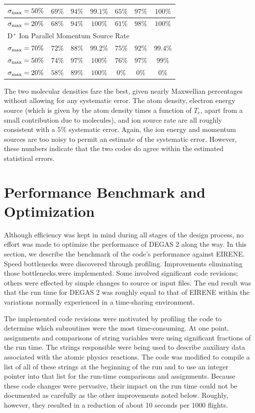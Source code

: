 \documentclass[12pt]{report}
\begin{document}
\begin{tabular}{|c||c|c|c||c|c|c|}
$\sigma_{\rm max}=50 \%$ & $69 \%$ & $94 \%$ & $99.1 \%$ & $65 \%$ & $97 \%$ & $100  \%$ \\ \hline
$\sigma_{\rm max}=20 \%$ & $68 \%$ & $94 \%$ & $100  \%$ & $61 \%$ & $98 \%$ & $100  \%$ \\ \hline
\multicolumn{7}{|l|}{D$^{+}$ Ion Parallel Momentum Source Rate} \\ \hline
$\sigma_{\rm max}=70 \%$ & $72 \%$ & $88 \%$ & $99.2 \%$ & $75 \%$ & $92  \%$ & $99.4 \%$ \\ \hline
$\sigma_{\rm max}=50 \%$ & $74 \%$ & $97 \%$ & $100 \%$ & $76 \%$ & $97  \%$ & $99   \%$ \\ \hline
$\sigma_{\rm max}=20 \%$ & $58 \%$ & $89 \%$ & $100 \%$ & $0  \%$ & $0   \%$ & $0    \%$ \\ \hline
\end{tabular}

The two molecular densities fare the best, given nearly Maxwellian percentages
without allowing for any systematic error. The atom density,  electron
energy source (which is given by the atom density times a function of $T_{e}$,
apart from a small contribution due to molecules), and ion
source rate are all roughly consistent
with a $5 \%$ systematic error. Again, the ion energy and momentum sources
are too noisy to permit an estimate of the systematic error. However, these
numbers indicate that the two codes do agree within the estimated
statistical errors.

\section{Performance Benchmark and Optimization}
\label{performance}

Although efficiency was kept in mind during all
stages of the design process, no effort was made to optimize the
performance of DEGAS 2 along the way.
In this section, we describe the benchmark of the code's performance against 
EIRENE. Speed bottlenecks were discovered through profiling. 
Improvements eliminating those bottlenecks.were implemented.
Some involved
significant code revisions; others were
effected by simple changes to source or
input files. The end result was that the run time for DEGAS 2 was 
roughly equal to
that of EIRENE within the variations normally experienced in a time-sharing
environment.

The implemented code revisions were motivated by profiling the code to
determine which subroutines were the most time-consuming. At one point,
assignments and comparisons of string variables were using significant
fractions of the run time. The strings responsible were 
being used to 
describe auxiliary data associated with the atomic physics reactions.
The code was modified to compile a list of all of these strings at the
beginning of the run and to use an integer pointer into that list for
the run-time comparisons and assignments. Because these code changes
were pervasive, their impact on the run time could not be documented
as carefully as the other improvements noted below. Roughly, however,
they resulted in a reduction of about 10 seconds per 
1000 flights.
\end{document}
